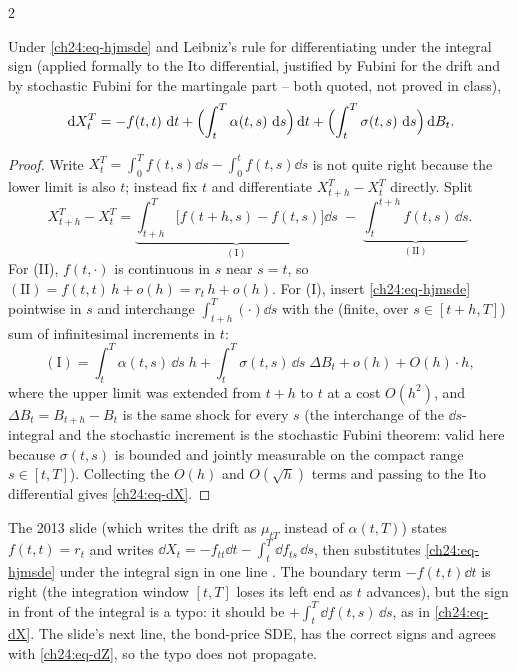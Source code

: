 \begin{paracol}{2}
\begin{lemma}\label{ch24:lem-dX}
Under \eqref{ch24:eq-hjmsde} and Leibniz's rule for differentiating under the integral sign (applied formally to the Ito differential, justified by Fubini for the drift and by stochastic Fubini for the martingale part -- both quoted, not proved in class),
\begin{equation}\label{ch24:eq-dX}
  \,\mathrm{d} X_t^T=-f(t,t)\,\,\mathrm{d} t+\Bigl(\int_t^T\alpha(t,s)\,\,\mathrm{d} s\Bigr)\,\mathrm{d} t+\Bigl(\int_t^T\sigma(t,s)\,\,\mathrm{d} s\Bigr)\,\mathrm{d} B_t .
\end{equation}
\end{lemma}
\begin{proof}
Write $X_t^T=\int_0^Tf(t,s)\dd s-\int_0^tf(t,s)\dd s$ is not quite right because the lower limit is also $t$; instead fix $t$ and differentiate $X_{t+h}^T-X_t^T$ directly. Split
\[
  X_{t+h}^T-X_t^T=\underbrace{\int_{t+h}^T\bigl[f(t+h,s)-f(t,s)\bigr]\dd s}_{(\mathrm{I})}\;-\;\underbrace{\int_t^{t+h}f(t,s)\,\dd s}_{(\mathrm{II})} .
\]
For (II), $f(t,\cdot)$ is continuous in $s$ near $s=t$, so $(\mathrm{II})=f(t,t)\,h+o(h)=r_t\,h+o(h)$. For (I), insert \eqref{ch24:eq-hjmsde} pointwise in $s$ and interchange $\int_{t+h}^T(\cdot)\dd s$ with the (finite, over $s\in[t+h,T]$) sum of infinitesimal increments in $t$:
\[
  (\mathrm{I})=\int_t^T\alpha(t,s)\,\dd s\;h+\int_t^T\sigma(t,s)\,\dd s\;\Delta B_t+o(h)+O(h)\cdot h,
\]
where the upper limit was extended from $t+h$ to $t$ at a cost $O(h^2)$, and $\Delta B_t=B_{t+h}-B_t$ is the same shock for every $s$ (the interchange of the $\dd s$-integral and the stochastic increment is the stochastic Fubini theorem: valid here because $\sigma(t,s)$ is bounded and jointly measurable on the compact range $s\in[t,T]$). Collecting the $O(h)$ and $O(\sqrt h)$ terms and passing to the Ito differential gives \eqref{ch24:eq-dX}.
\end{proof}
\begin{coursenote}
The 2013 slide (which writes the drift as $\mu_{tT}$ instead of $\alpha(t,T)$) states $f(t,t)=r_t$ and writes $\dd X_t=-f_{tt}\dd t-\int_t^T\dd f_{ts}\,\dd s$, then substitutes \eqref{ch24:eq-hjmsde} under the integral sign in one line . The boundary term $-f(t,t)\dd t$ is right (the integration window $[t,T]$ loses its left end as $t$ advances), but the sign in front of the integral is a typo: it should be $+\int_t^T\dd f(t,s)\,\dd s$, as in \eqref{ch24:eq-dX}. The slide's next line, the bond-price SDE, has the correct signs and agrees with \eqref{ch24:eq-dZ}, so the typo does not propagate.
\end{coursenote}


\end{paracol}
